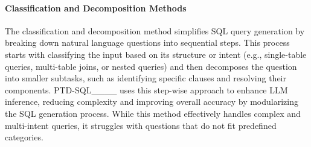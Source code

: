 \paragraph{Classification and Decomposition Methods}
The classification and decomposition method simplifies SQL query generation by breaking down natural language questions into sequential steps. This process starts with classifying the input based on its structure or intent (e.g., single-table queries, multi-table joins, or nested queries) and then decomposes the question into smaller subtasks, such as identifying specific clauses and resolving their components. PTD-SQL____ uses this step-wise approach to enhance LLM inference, reducing complexity and improving overall accuracy by modularizing the SQL generation process. While this method effectively handles complex and multi-intent queries, it struggles with questions that do not fit predefined categories.

